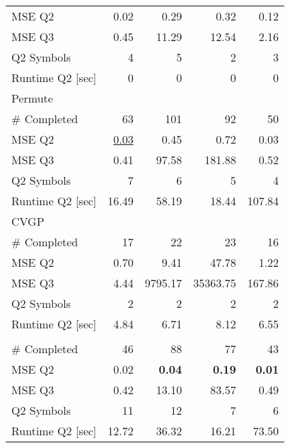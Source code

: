 \begin{tabularx}{\textwidth}{lRRRR}
\qquad MSE Q2  &  0.02  &  0.29  &  0.32  &  0.12  \\ 
\qquad MSE Q3  &  0.45  &  11.29  &  12.54  &  2.16  \\ 
\qquad Q2 Symbols  &  4\phantom{.00}  &  5\phantom{.00}  &  2\phantom{.00}  &  3\phantom{.00}  \\ 
\qquad Runtime Q2 [sec]  &  0\phantom{.00}  &  0\phantom{.00}  &  0\phantom{.00}  &  0\phantom{.00}  \\ 
Permute  &     &     &     &     \\ 
\qquad  \# Completed  &  63\phantom{.00}  &  101\phantom{.00}  &  92\phantom{.00}  &  50\phantom{.00}  \\ 
\qquad MSE Q2  &  \underline{0.03}  &  0.45  &  0.72  &  0.03  \\ 
\qquad MSE Q3  &  0.41  &  97.58  &  181.88  &  0.52  \\ 
\qquad Q2 Symbols  &  7\phantom{.00}  &  6\phantom{.00}  &  5\phantom{.00}  &  4\phantom{.00}  \\ 
\qquad Runtime Q2 [sec]  &  16.49  &  58.19  &  18.44  &  107.84  \\ 
CVGP  &     &     &     &     \\ 
\qquad  \# Completed  &  17\phantom{.00}  &  22\phantom{.00}  &  23\phantom{.00}  &  16\phantom{.00}  \\ 
\qquad MSE Q2  &  0.70  &  9.41  &  47.78  &  1.22  \\ 
\qquad MSE Q3  &  4.44  &  9795.17  &  35363.75  &  167.86  \\ 
\qquad Q2 Symbols  &  2\phantom{.00}  &  2\phantom{.00}  &  2\phantom{.00}  &  2\phantom{.00}  \\ 
\qquad Runtime Q2 [sec]  &  4.84  &  6.71  &  8.12  &  6.55  \\ 
\ours{}  &     &     &     &     \\ 
\qquad  \# Completed  &  46\phantom{.00}  &  88\phantom{.00}  &  77\phantom{.00}  &  43\phantom{.00}  \\ 
\qquad MSE Q2  &  0.02  &  \textbf{0.04}  &  \textbf{0.19}  &  \textbf{0.01}  \\ 
\qquad MSE Q3  &  0.42  &  13.10  &  83.57  &  0.49  \\ 
\qquad Q2 Symbols  &  11\phantom{.00}  &  12\phantom{.00}  &  7\phantom{.00}  &  6\phantom{.00}  \\ 
\qquad Runtime Q2 [sec]  &  12.72  &  36.32  &  16.21  &  73.50  \\ 
\bottomrule
\end{tabularx}{\textwidth}
